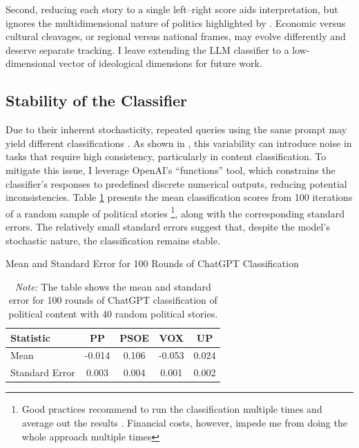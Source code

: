 \documentclass[12pt]{article}
\begin{document}
Second, reducing each story to a single left–right score aids interpretation, but ignores the multidimensional nature of politics highlighted by \citet{puglisi2011newspapers}. Economic versus cultural cleavages, or regional versus national frames, may evolve differently and deserve separate tracking. I leave extending the LLM classifier to a low-dimensional vector of ideological dimensions for future work.




\subsection{Stability of the Classifier}


Due to their inherent stochasticity, repeated queries using the same prompt may yield different classifications \citep{llmstability2024}. As shown in \citep{llmclassification2024}, this variability can introduce noise in tasks that require high consistency, particularly in content classification. To mitigate this issue, I leverage OpenAI’s “functions” tool, which constrains the classifier’s responses to predefined discrete numerical outputs, reducing potential inconsistencies. Table \ref{tab:table_stability} presents the mean classification scores from 100 iterations of a random sample of political stories \footnote{Good practices recommend to run the classification multiple times and average out the results \citep{tornberg2023}. Financial costs, however, impede me from doing the whole approach multiple times}, along with the corresponding standard errors. The relatively small standard errors suggest that, despite the model’s stochastic nature, the classification remains stable.





\begin{table}[!htb]
	\centering
	\caption{Mean and Standard Error for 100 Rounds of ChatGPT Classification}
	\begin{tabular}{|l|c|c|c|c|}
		\hline
		\textbf{Statistic} & \textbf{PP} & \textbf{PSOE} & \textbf{VOX} & \textbf{UP} \\
		\hline
		Mean & -0.014 & 0.106 & -0.053 & 0.024 \\
		Standard Error & 0.003 & 0.004 & 0.001 & 0.002 \\
		\hline
	\end{tabular}
	\caption*{\small \textit{Note:}  The table shows the mean and standard error for 100 rounds of ChatGPT classification of political content with 40 random political stories.}
	\label{tab:table_stability}
\end{table}
\end{document}
